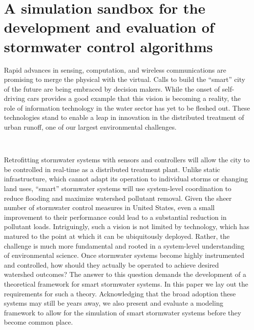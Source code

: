 \chapter{A simulation sandbox for the development and evaluation of stormwater control algorithms}\label{ch:pystorms}
Rapid advances in sensing, computation, and wireless communications are promising to merge the physical with the virtual.
Calls to build the ``smart'' city of the future are being embraced by decision makers.
While the onset of self-driving cars provides a good example that this vision is becoming a reality, the role  of information technology in the water sector has yet to be fleshed out.
These technologies stand to enable a leap in innovation in the distributed treatment of urban runoff, one of our largest environmental challenges. 

\

Retrofitting stormwater systems with sensors and controllers will allow the city to be controlled in real-time as a distributed treatment plant.
Unlike static infrastructure, which cannot adapt its operation to individual storms or changing land uses, ``smart'' stormwater systems will use system-level coordination to reduce flooding and maximize watershed pollutant removal.
Given the sheer number of stormwater control measures in United States, even a small improvement to their performance could lead to a substantial reduction in pollutant loads.
Intriguingly, such a vision is not limited by technology, which has matured to the point at which it can be ubiquitously deployed. 
Rather, the challenge is much more fundamental and rooted in a system-level understanding of environmental science.
Once stormwater systems become highly instrumented and controlled, how should they actually be operated to achieve desired watershed outcomes?
The answer to this question demands the development of a theoretical framework for smart stormwater systems. 
In this paper we lay out the requirements for such a theory.  Acknowledging that the broad adoption these systems may still be years away,  we also present and evaluate a modeling framework to allow for the simulation of smart stormwater systems before they become common place.

